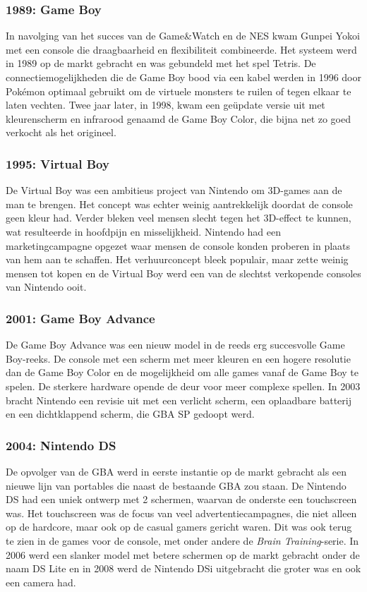\documentclass{article}
\begin{document}
\subsubsection{1989: Game Boy}
In navolging van het succes van de Game\&Watch en de NES kwam Gunpei Yokoi met een console die draagbaarheid en flexibiliteit combineerde. Het systeem werd in 1989 op de markt gebracht en was gebundeld met het spel Tetris. De connectiemogelijkheden die de Game Boy bood via een kabel werden in 1996 door Pok\'emon optimaal gebruikt om de virtuele monsters te ruilen of tegen elkaar te laten vechten. Twee jaar later, in 1998, kwam een ge\"update versie uit met kleurenscherm en infrarood genaamd de Game Boy Color, die bijna net zo goed verkocht als het origineel.
\subsubsection{1995: Virtual Boy}
De Virtual Boy was een ambitieus project van Nintendo om 3D-games aan de man te brengen. Het concept was echter weinig aantrekkelijk doordat de console geen kleur had. Verder bleken veel mensen slecht tegen het 3D-effect te kunnen, wat resulteerde in hoofdpijn en misselijkheid. Nintendo had een marketingcampagne opgezet waar mensen de console konden proberen in plaats van hem aan te schaffen. Het verhuurconcept bleek populair, maar zette weinig mensen tot kopen en de Virtual Boy werd een van de slechtst verkopende consoles van Nintendo ooit. 
\subsubsection{2001: Game Boy Advance}
De Game Boy Advance was een nieuw model in de reeds erg succesvolle Game Boy-reeks. De console met een scherm met meer kleuren en een hogere resolutie dan de Game Boy Color en de mogelijkheid om alle games vanaf de Game Boy te spelen. De sterkere hardware opende de deur voor meer complexe spellen. In 2003 bracht Nintendo een revisie uit met een verlicht scherm, een oplaadbare batterij en een dichtklappend scherm, die GBA SP gedoopt werd.
\subsubsection{2004: Nintendo DS}
De opvolger van de GBA werd in eerste instantie op de markt gebracht als een nieuwe lijn van portables die naast de bestaande GBA zou staan. De Nintendo DS had een uniek ontwerp met 2 schermen, waarvan de onderste een touchscreen was. Het touchscreen was de focus van veel advertentiecampagnes, die niet alleen op de hardcore, maar ook op de casual gamers gericht waren. Dit was ook terug te zien in de games voor de console, met onder andere de \textit{Brain Training}-serie. In 2006 werd een slanker model met betere schermen op de markt gebracht onder de naam DS Lite en in 2008 werd de Nintendo DSi uitgebracht die groter was en ook een camera had. 
\end{document}
